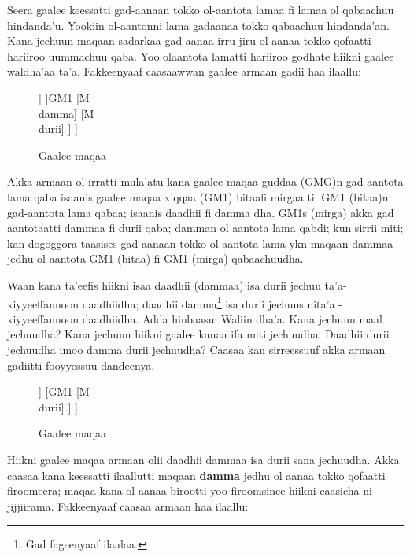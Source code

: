 \documentclass[11pt,b5paper]{book}
\begin{document}
Seera gaalee keessatti gad-aanaan tokko ol-aantota lamaa fi lamaa ol qabaachuu hindanda’u. Yookiin ol-aantonni lama gadaanaa tokko qabaachuu hindanda’an. Kana jechuun maqaan sadarkaa gad aanaa irru jiru ol aanaa tokko qofaatti hariiroo uummachuu qaba. Yoo olaantota lamatti hariiroo godhate hiikni gaalee waldha'aa ta'a. Fakkeenyaaf caasaawwan gaalee armaan gadii haa ilaallu:
\begin{figure}[H]										
	\caption{Gaalee maqaa}
	\centering
	\begin{forest}
		[GMG
			[GM1
				[M\\daadhii]
			[	M\\damma]
			]
			[GM1
				[M\\damma]
				[M\\durii]
			]
		]
	\end{forest}
\end{figure}

Akka armaan ol irratti mula’atu kana gaalee maqaa guddaa (GMG)n gad-aantota lama qaba isaanis gaalee maqaa xiqqaa
(GM1) bitaafi mirgaa ti. GM1 (bitaa)n gad-aantota lama qabaa; isaanis daadhii fi damma dha. GM1s (mirga) akka gad
aantotaatti dammaa fi durii qaba; damman ol aantota lama qabdi; kun sirrii miti; kan dogoggora taasises gad-aanaan tokko ol-aantota lama ykn maqaan dammaa jedhu ol-aantota GM1 (bitaa) fi GM1 (mirga) qabaachuudha.

Waan kana ta'eefis hiikni isaa daadhii (dammaa) isa durii jechuu ta'a-xiyyeeffannoon daadhiidha; daadhii damma\footnote{Gad fageenyaaf \cite{baye1986phrase} ilaalaa.} isa durii jechuus nita'a - xiyyeeffannoon daadhiidha. Adda hinbaasu. Waliin dha'a. Kana jechuun maal jechuudha? Kana jechuun hiikni gaalee kanaa ifa miti jechuudha. Daadhii durii jechuudha imoo damma durii jechuudha? Caasaa kan sirreessuuf akka armaan gadiitti fooyyessuu dandeenya. 

\begin{figure}[H]										
	\caption{Gaalee maqaa}
	\centering
	\begin{forest}
		[GMG
			[GM1
				[M\\daadhii]
				[M\\damma]
			]
			[GM1
				[M\\durii]
			]
		]
	\end{forest}
\end{figure}
Hiikni gaalee maqaa armaan olii daadhii dammaa isa durii sana jechuudha. Akka caasaa kana keessatti ilaallutti maqaan \textbf{damma} jedhu ol aanaa tokko qofaatti firoomeera; maqaa kana ol aanaa birootti yoo firoomsinee hiikni caasicha ni jijjiirama. Fakkeenyaaf caasaa armaan haa ilaallu:
\end{document}
